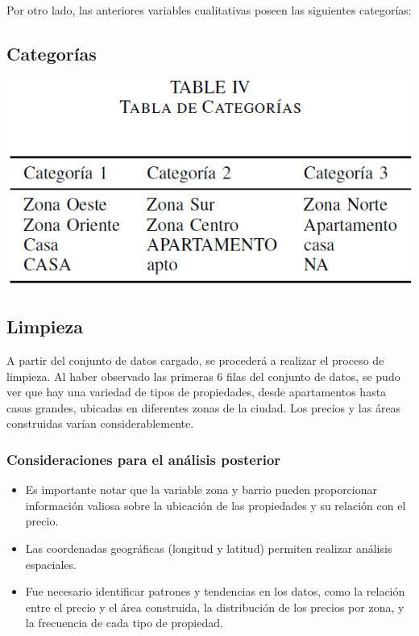 \documentclass[conference,final,]{IEEEtran}
\begin{document}
Por otro lado, las anteriores variables cualitativas poseen las
siguientes categorías:

\subsection{\textbf{Categorías}}

\begin{center}\includegraphics[width=0.8\linewidth]{images/Tabla4} \end{center}

\subsection{\textbf{Limpieza}}

A partir del conjunto de datos cargado, se procederá a realizar el
proceso de limpieza. Al haber observado las primeras 6 filas del
conjunto de datos, se pudo ver que hay una variedad de tipos de
propiedades, desde apartamentos hasta casas grandes, ubicadas en
diferentes zonas de la ciudad. Los precios y las áreas construidas
varían considerablemente.

\subsubsection{\textbf{Consideraciones para el análisis posterior}}

\begin{itemize}
\item
  Es importante notar que la variable zona y barrio pueden proporcionar
  información valiosa sobre la ubicación de las propiedades y su
  relación con el precio.
\item
  Las coordenadas geográficas (longitud y latitud) permiten realizar
  análisis espaciales.
\item
  Fue necesario identificar patrones y tendencias en los datos, como la
  relación entre el precio y el área construida, la distribución de los
  precios por zona, y la frecuencia de cada tipo de propiedad.
\end{itemize}
\end{document}

